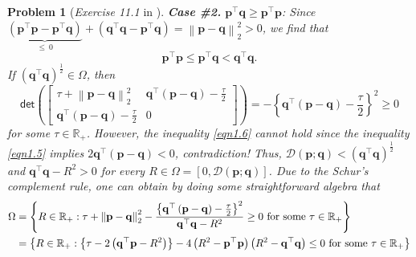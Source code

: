 \documentclass[11pt]{article}
\newtheorem{problem}{Problem}
\numberwithin{equation}{problem}
\begin{document}
\begin{problem} [\emph{Exercise 11.1} in \cite{calafiore2014optimization}]
{\indent \textbf{Case \#2.} $\mathbf{p}^{\top} \mathbf{q} \geq \mathbf{p}^{\top} \mathbf{p}$: Since $\underbrace{\left( \mathbf{p}^{\top} \mathbf{p} - \mathbf{p}^{\top} \mathbf{q} \right)}_{\leq \ 0} + \left( \mathbf{q}^{\top} \mathbf{q} - \mathbf{p}^{\top} \mathbf{q} \right) = \left\| \mathbf{p} - \mathbf{q} \right\|_{2}^2 > 0$, we find that
\begin{equation}
    \label{eqn1.6}
    \mathbf{p}^{\top} \mathbf{p} \leq \mathbf{p}^{\top} \mathbf{q} < \mathbf{q}^{\top} \mathbf{q}.
\end{equation}
If $\left( \mathbf{q}^{\top} \mathbf{q} \right)^{\frac{1}{2}} \in \Omega$, then
\begin{equation}
    \label{eqn1.7}
    \textsf{det} \left(
    \begin{bmatrix}
        \tau + \left\| \mathbf{p} - \mathbf{q} \right\|_{2}^2 & \mathbf{q}^{\top} \left( \mathbf{p} - \mathbf{q} \right) - \frac{\tau}{2} \\
        \mathbf{q}^{\top} \left( \mathbf{p} - \mathbf{q} \right) - \frac{\tau}{2} & 0
    \end{bmatrix}
    \right)
    = - \left\{ \mathbf{q}^{\top} \left( \mathbf{p} - \mathbf{q} \right) - \frac{\tau}{2} \right\}^2 \geq 0
\end{equation}
for some $\tau \in \mathbb{R}_{+}$. However, the inequality \eqref{eqn1.6} cannot hold since the inequality \eqref{eqn1.5} implies $2 \mathbf{q}^{\top} \left( \mathbf{p} - \mathbf{q} \right) < 0$, contradiction! Thus, $\mathcal{D} \left( \mathbf{p}; \mathbf{q} \right) < \left( \mathbf{q}^{\top} \mathbf{q} \right)^{\frac{1}{2}}$ and $\mathbf{q}^{\top} \mathbf{q} - R^2 > 0$ for every $R \in \Omega = \left[ 0, \mathcal{D} \left( \mathbf{p}; \mathbf{q} \right) \right]$. Due to the Schur's complement rule, one can obtain by doing some straightforward algebra that
\begin{equation}
    \label{eqn1.8}
    \begin{split}
        \Omega &=
        \left\{ R \in \mathbb{R}_{+} : \tau + \left\| \mathbf{p} - \mathbf{q} \right\|_{2}^2 - \frac{\left\{ \mathbf{q}^{\top} \left( \mathbf{p} - \mathbf{q} \right) - \frac{\tau}{2} \right\}^2}{\mathbf{q}^{\top} \mathbf{q} - R^2} \geq 0 \textnormal{ for some } \tau \in \mathbb{R}_{+} \right\} \\
        &= \left\{ R \in \mathbb{R}_{+} : \left\{ \tau - 2 \left( \mathbf{q}^{\top} \mathbf{p} - R^2 \right) \right\} - 4 \left( R^2 - \mathbf{p}^{\top} \mathbf{p} \right) \left( R^2 - \mathbf{q}^{\top} \mathbf{q} \right) \leq 0 \textnormal{ for some } \tau \in \mathbb{R}_{+} \right\} \\

\end{split}
\end{equation}}
\end{problem}
\end{document}

